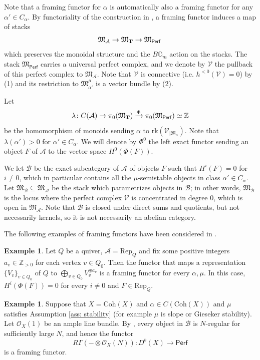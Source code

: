 \documentclass[12pt]{amsart}
\theoremstyle{definition}
\newtheorem{example}[definition]{Example}
\newcommand{\BG}{{\mathbb{G}}}
\newcommand{\BZ}{{\mathbb{Z}}}
\newcommand{\CA}{{\mathcal A}}
\newcommand{\CB}{{\mathcal B}}
\newcommand{\CO}{{\mathcal O}}
\newcommand{\CV}{{\mathcal V}}
\newcommand{\1}{\mathbf 1}
\newcommand{\bfT}{{\bf T}}
\newcommand{\FM}{{\mathfrak{M}}}
\newcommand{\Coh}{\mathrm{Coh}}
\newcommand{\Perf}{\mathsf{Perf}}
\newcommand{\Rep}{\mathrm{Rep}}
\newcommand{\rk}{\mathrm{rk}}
\begin{document}
Note that a framing functor for $\alpha$ is automatically also a framing functor for any $\alpha'\in C_\alpha$. By functoriality of the construction in \cite{TV07}, a framing functor induces a map of stacks
\[\FM_\CA\to \FM_{\bfT}\to \FM_{\Perf}\,\]
which preserves the monoidal structure and the $B\BG_m$ action on the stacks. The stack $\FM_{\Perf}$ carries a universal perfect complex, and we denote by $\CV$ the pullback of this perfect complex to $\FM_\CA$. Note that $\CV$ is connective (i.e. $h^{<0}(\CV)=0$) by (1) and its restriction to $\FM_{\alpha'}^\mu$ is a vector bundle by (2).


Let 
\[\lambda\colon C(\CA)\xrightarrow{\,}\pi_0(\FM_\bfT)\xrightarrow{\Phi} \pi_0(\FM_{\Perf})\simeq \BZ\]
be the homomorphism of monoids sending $\alpha$ to $\rk(\CV_{|\FM_{\alpha}})$. Note that $\lambda(\alpha')>0$ for $\alpha'\in C_\alpha$. We will denote by $\Phi^0$ the left exact functor sending an object $F$ of $\CA$ to the vector space $H^0(\Phi(F))$. 

We let $\CB$ be the exact subcategory of $\CA$ of objects $F$ such that $H^i(F)=0$ for $i\neq 0$, which in particular contains all the $\mu$-semistable objects in class $\alpha'\in C_\alpha$. Let $\FM_\CB\subseteq \FM_\CA$ be the stack which parametrizes objects in $\CB$; in other words, $\FM_\CB$ is the locus where the perfect complex $\CV$ is concentrated in degree 0, which is open in $\FM_\CA$. Note that $\CB$ is closed under direct sums and quotients, but not necessarily kernels, so it is not necessarily an abelian category.

The following examples of framing functors have been considered in \cite{joyce, GJT, bu, parabolic}.

\begin{example}
Let $Q$ be a quiver, $\CA=\Rep_Q$ and fix some positive integers $a_v\in \BZ_{>0}$ for each vertex $v\in Q_0$. Then the functor that maps a representation $\{V_v\}_{v\in Q_0}$ of $Q$ to $\bigoplus_{v\in Q_0} V_v^{\oplus a_v}$ is a framing functor for every $\alpha, \mu$. In this case, $H^i(\Phi(F))=0$ for every $i\neq 0$ and $F\in \Rep_Q$. 
\end{example}

\begin{example}
    Suppose that $X=\Coh(X)$ and $\alpha\in C(\Coh(X))$ and $\mu$ satisfies Assumption \ref{ass: stability} (for example $\mu$ is slope or Gieseker stability). Let $\CO_X(1)$ be an ample line bundle. By \cite[Lemma 1.7.2]{HL}, every object in $\CB$ is $N$-regular for sufficiently large $N$, and hence the functor
    \[R\Gamma(-\otimes \CO_X(N))\colon D^b(X)\to \Perf\]
    is a framing functor.
\end{example}
\end{document}
